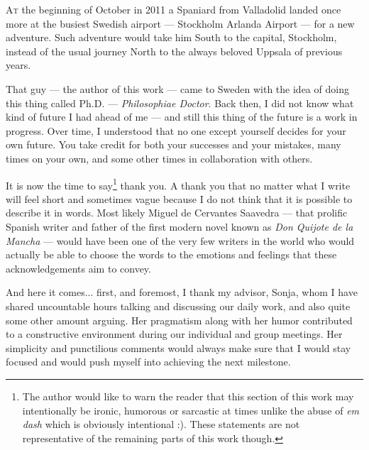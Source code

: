 

\lettrine{\textcolor[gray]{.25}{A}}{t} the beginning of October in 2011 a Spaniard from Valladolid landed once more 
at the busiest Swedish airport --- Stockholm Arlanda Airport --- for a new adventure. 
Such adventure would take him South to the capital, Stockholm, instead of the usual 
journey North to the always beloved Uppsala of previous years.

That guy --- the author of this work --- came to Sweden with the idea of doing this 
thing called Ph.D. --- \emph{Philosophiae Doctor}. Back then, I did not know what 
kind of future I had ahead of me --- and still this thing of the future is a work 
in progress. Over time, I understood that no one except yourself decides for your 
own future. You take credit for both your successes and your mistakes, many times 
on your own, and some other times in collaboration with others.

It is now the time to say\footnote{The author would like to warn the reader that 
this section of this work may intentionally be ironic, humorous or sarcastic at 
times unlike the abuse of \emph{em dash} which is obviously intentional :). These 
statements are not representative of the remaining parts of this work though.} thank 
you. A thank you that no matter what I write will feel short and sometimes vague 
because I do not think that it is possible to describe it in words. Most likely 
Miguel de Cervantes Saavedra --- that prolific Spanish writer and father of the 
first modern novel known as \emph{Don Quijote de la Mancha} --- would have been 
one of the very few writers in the world who would actually be able to choose the 
words to the emotions and feelings that these acknowledgements aim to convey.

And here it comes... first, and foremost, I thank my advisor, Sonja, whom I have 
shared uncountable hours talking and discussing our daily work, and also quite some 
other amount arguing. Her pragmatism along with her humor contributed to a constructive 
environment during our individual and group meetings. Her simplicity and punctilious 
comments would always make sure that I would stay focused and would push myself 
into achieving the next milestone. 

